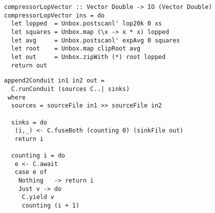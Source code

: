 
\begin{lstlisting}[float=ht,label=l:a:bench:compressorLopVector,caption=Vector implementation of \Hs/compressor/ with low-pass]
compressorLopVector :: Vector Double -> IO (Vector Double)
compressorLopVector ins = do
  let lopped  = Unbox.postscanl' lop20k 0 xs
  let squares = Unbox.map (\x -> x * x) lopped
  let avg     = Unbox.postscanl' expAvg 0 squares
  let root    = Unbox.map clipRoot avg
  let out     = Unbox.zipWith (*) root lopped
  return out
\end{lstlisting}

% 

\begin{lstlisting}[float=ht,label=l:a:bench:append2Conduit,caption=Conduit implementation of \Hs/append2/]
append2Conduit in1 in2 out =
  C.runConduit (sources C..| sinks)
 where
  sources = sourceFile in1 >> sourceFile in2

  sinks = do
   (i,_) <- C.fuseBoth (counting 0) (sinkFile out)
   return i

  counting i = do
   e <- C.await
   case e of
    Nothing   -> return i
    Just v -> do
     C.yield v
     counting (i + 1)
\end{lstlisting}

